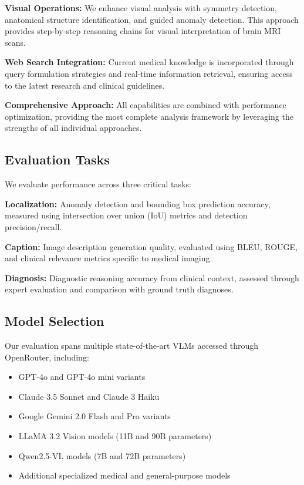 \documentclass[runningheads]{llncs}
\begin{document}
\textbf{Visual Operations:} We enhance visual analysis with symmetry detection, anatomical structure identification, and guided anomaly detection. This approach provides step-by-step reasoning chains for visual interpretation of brain MRI scans.

\textbf{Web Search Integration:} Current medical knowledge is incorporated through query formulation strategies and real-time information retrieval, ensuring access to the latest research and clinical guidelines.

\textbf{Comprehensive Approach:} All capabilities are combined with performance optimization, providing the most complete analysis framework by leveraging the strengths of all individual approaches.

\subsection{Evaluation Tasks}

We evaluate performance across three critical tasks:

\textbf{Localization:} Anomaly detection and bounding box prediction accuracy, measured using intersection over union (IoU) metrics and detection precision/recall.

\textbf{Caption:} Image description generation quality, evaluated using BLEU, ROUGE, and clinical relevance metrics specific to medical imaging.

\textbf{Diagnosis:} Diagnostic reasoning accuracy from clinical context, assessed through expert evaluation and comparison with ground truth diagnoses.

\subsection{Model Selection}

Our evaluation spans multiple state-of-the-art VLMs accessed through OpenRouter, including:
\begin{itemize}
\item GPT-4o and GPT-4o mini variants
\item Claude 3.5 Sonnet and Claude 3 Haiku
\item Google Gemini 2.0 Flash and Pro variants
\item LLaMA 3.2 Vision models (11B and 90B parameters)
\item Qwen2.5-VL models (7B and 72B parameters)
\item Additional specialized medical and general-purpose models
\end{itemize}
\end{document}
